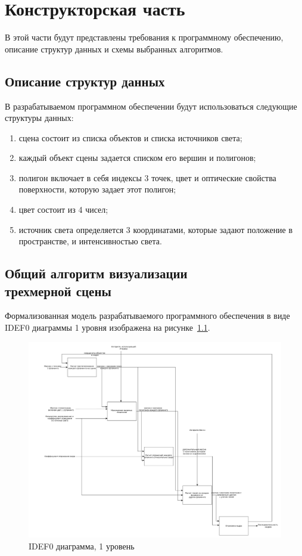 \chapter{Конструкторская часть}

В этой части будут представлены требования к программному обеспечению, описание структур данных и схемы выбранных алгоритмов.

\section{Описание структур данных}

В разрабатываемом программном обеспечении будут использоваться следующие структуры данных:
\begin{enumerate}[label=\arabic*)]
	\item сцена состоит из списка объектов и списка источников света;
	\item каждый объект сцены задается списком его вершин и полигонов;
	\item полигон включает в себя индексы 3 точек, цвет и оптические свойства поверхности, которую задает этот полигон;
	\item цвет состоит из 4 чисел;
	\item источник света определяется 3 координатами, которые задают положение в пространстве, и интенсивностью света.
\end{enumerate}

\section[Общий алгоритм визуализации трехмерной сцены]{Общий алгоритм визуализации\\трехмерной сцены}

Формализованная модель разрабатываемого программного обеспечения в виде IDEF0 диаграммы 1 уровня изображена на рисунке~\ref{fig:idef1}.

\begin{figure}[h!]
	\centering
	\includegraphics[width=\linewidth]{img/idef1}
	\caption{IDEF0 диаграмма, 1 уровень}
	\label{fig:idef1}
\end{figure}


